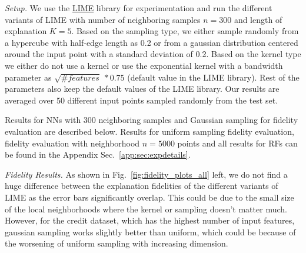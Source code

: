 \textit{Setup.} We use the \hyperlink{https://github.com/marcotcr/lime}{LIME} library for experimentation and run the different variants of LIME with number of neighboring samples $n=300$ and length of explanation $K=5$. Based on the sampling type, we either sample randomly from a hypercube with half-edge length as 0.2 or from a gaussian distribution centered around the input point with a standard deviation of 0.2. Based on the kernel type we either do not use a kernel or use the exponential kernel with a bandwidth parameter as $\sqrt{\#features}~* 0.75$ (default value in the LIME library). Rest of the parameters also keep the default values of the LIME library. Our results are averaged over 50 different input points sampled randomly from the test set.

Results for NNs with 300 neighboring samples and Gaussian sampling for fidelity evaluation are described below. Results for uniform sampling fidelity evaluation, fidelity evaluation with neighborhood $n=5000$ points and all results for RFs can be found in the Appendix Sec.~\ref{app:sec:expdetails}.

\textit{Fidelity Results.} As shown in Fig.~\ref{fig:fidelity_plots_all} left, we do not find a huge difference between the explanation fidelities of the different variants of LIME as the error bars significantly overlap. This could be due to the small size of the local neighborhoods where the kernel or sampling doesn't matter much. However, for the credit dataset, which has the highest number of input features, gaussian sampling works slightly better than uniform, which could be because of the worsening of uniform sampling with increasing dimension.




